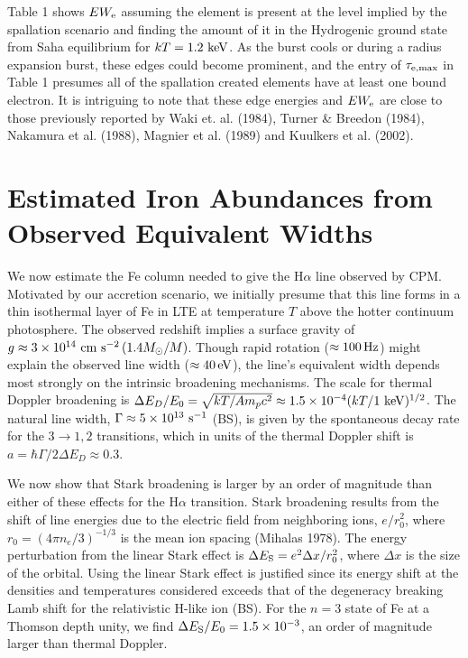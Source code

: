 \documentclass[iop,apjl,letterpaper]{emulateapj}
\begin{document}
Table 1 shows $EW_{\rm e}$ assuming the element is present at the
level implied by the spallation scenario and finding the amount of it
in the Hydrogenic ground state from Saha equilibrium for $kT=1.2 \
{\rm keV}$.  As the burst cools or during a radius expansion burst,
these edges could become prominent, and the entry of $\tau_{\rm e,max}
$ in Table 1 presumes all of the spallation created elements have at
least one bound electron. It is intriguing to note that these edge
energies and $EW_{\rm e}$ are close to those previously reported by
Waki et. al. (1984), Turner \& Breedon (1984), Nakamura et al. (1988),
Magnier et al.  (1989) and Kuulkers et al. (2002).

\section{Estimated Iron Abundances from Observed Equivalent Widths} 

We now estimate the Fe column needed to give the H$\alpha$ line
observed by CPM.  Motivated by our accretion scenario, we initially
presume that this line forms in a thin isothermal layer of Fe in LTE
at temperature $T$ above the hotter continuum photosphere.  The
observed redshift implies a surface gravity of $g\approx 3\times
10^{14}\ {\rm cm\ s}^{-2}\,(1.4M_\odot/M)$.  Though rapid rotation
($\approx 100\,{\rm Hz}$) might explain the observed line width
($\approx 40\,{\rm eV}$), the line's equivalent width depends most
strongly on 
the intrinsic broadening mechanisms. The scale for thermal Doppler
broadening is $\Delta E_D/E_0 = \sqrt{kT/Am_pc^2}\approx 1.5 \times
10^{-4} (kT/1\ {\rm keV})^{1/2}$.  The natural line width, $\Gamma
\approx 5\times 10^{13}\ {\rm s}^{-1}$ (BS), is given by the
spontaneous decay rate for the $3 \rightarrow 1,2$ transitions, which in
units of the thermal Doppler shift is $a = \hbar\Gamma/2\Delta E_D
\approx 0.3$.

We now show that Stark broadening is larger by an order of magnitude
than either of these effects for the H$\alpha$ transition.  Stark
broadening results from the shift of line energies due to the electric
field from neighboring ions, $e/r_0^2$, where $r_0 = (4\pi
n_e/3)^{-1/3}$ is the mean ion spacing (Mihalas 1978). The energy
perturbation from the linear Stark effect is $\Delta E_{\rm S} =e^2
\Delta x/r_0^2$, where $\Delta x$ is the size of the orbital.  Using
the linear Stark effect is justified since its energy shift at the
densities and temperatures considered exceeds that of the degeneracy
breaking Lamb shift for the relativistic H-like ion (BS). For the
$n=3$ state of Fe at a Thomson depth unity, we find ${\Delta E_{\rm
S}}/E_0 = 1.5 \times 10^{-3}$, an order of magnitude larger than
thermal Doppler.
\end{document}
